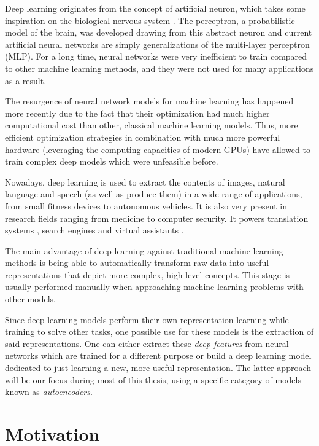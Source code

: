Deep learning originates from the concept of artificial neuron, which takes some inspiration on the biological nervous system . The perceptron, a probabilistic model of the brain, was developed drawing from this abstract neuron  and current artificial neural networks are simply generalizations of the multi-layer perceptron (MLP). For a long time, neural networks were very inefficient to train compared to other machine learning methods, and they were not used for many applications as a result.

The resurgence of neural network models for machine learning has happened more recently due to the fact that their optimization had much higher computational cost than other, classical machine learning models. Thus, more efficient optimization strategies in combination with much more powerful hardware (leveraging the computing capacities of modern GPUs) have allowed to train complex deep models which were unfeasible before.

Nowadays, deep learning is used to extract the contents of images, natural language and speech (as well as produce them) in a wide range of applications, from small fitness devices to autonomous vehicles. It is also very present in research fields ranging from medicine to computer security. It powers translation systems , search engines  and virtual assistants . 

The main advantage of deep learning against traditional machine learning methods is being able to automatically transform raw data into useful representations that depict more complex, high-level concepts. This stage is usually performed manually when approaching machine learning problems with other models.

Since deep learning models perform their own representation learning while training to solve other tasks, one possible use for these models is the extraction of said representations. One can either extract these \textit{deep features} from neural networks which are trained for a different purpose or build a deep learning model dedicated to just learning a new, more useful representation. The latter approach will be our focus during most of this thesis, using a specific category of models known as \textit{autoencoders}.

\section{Motivation}

